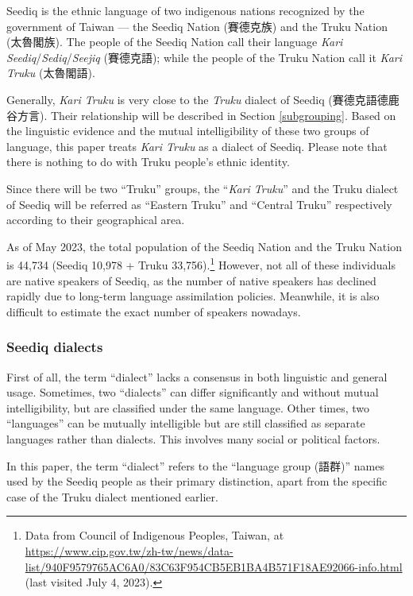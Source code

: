 \documentclass[12pt]{article}
\begin{document}
Seediq is the ethnic language of two indigenous nations recognized by the government of Taiwan --- the Seediq Nation (賽德克族) and the Truku Nation (太魯閣族). The people of the Seediq Nation call their language \textit{Kari Seediq}/\textit{Sediq}/\textit{Seejiq} (賽德克語); while the people of the Truku Nation call it \textit{Kari Truku} (太魯閣語). 

Generally, \textit{Kari Truku} is very close to the \textit{Truku} dialect of Seediq (賽德克語德鹿谷方言). Their relationship will be described in Section \ref{subgrouping}. Based on the linguistic evidence and the mutual intelligibility of these two groups of language, this paper treats \textit{Kari Truku} as a dialect of Seediq. Please note that there is nothing to do with Truku people's ethnic identity. 

Since there will be two ``Truku'' groups, the ``\textit{Kari Truku}'' and the Truku dialect of Seediq will be referred as ``Eastern Truku'' and ``Central Truku'' respectively according to their geographical area.

As of May 2023, the total population of the Seediq Nation and the Truku Nation is 44,734 (Seediq 10,978 + Truku 33,756).\footnote{Data from Council of Indigenous Peoples, Taiwan, at \href{https://www.cip.gov.tw/zh-tw/news/data-list/940F9579765AC6A0/83C63F954CB5EB1BA4B571F18AE92066-info.html}{https://www.cip.gov.tw/zh-tw/news/data-list/940F9579765AC6A0/83C63F954CB5EB1BA4B571F18AE92066-info.html} (last visited July 4, 2023).} However, not all of these individuals are native speakers of Seediq, as the number of native speakers has declined rapidly due to long-term language assimilation policies. Meanwhile, it is also difficult to estimate the exact number of speakers nowadays.

\subsubsection{Seediq dialects}

First of all, the term ``dialect'' lacks a consensus in both linguistic and general usage. Sometimes, two ``dialects'' can differ significantly and without mutual intelligibility, but are classified under the same language. Other times, two ``languages'' can be mutually intelligible but are still classified as separate languages rather than dialects. This involves many social or political factors.

In this paper, the term ``dialect'' refers to the ``language group (語群)'' names used by the Seediq people as their primary distinction, apart from the specific case of the Truku dialect mentioned earlier. 
\end{document}
